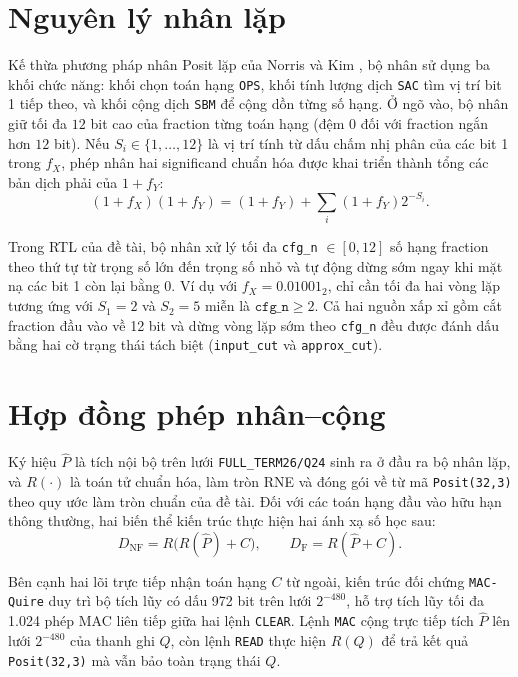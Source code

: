 

\section{Nguyên lý nhân lặp}
Kế thừa phương pháp nhân Posit lặp của Norris và Kim \cite{norris2021iterativeposit},
bộ nhân sử dụng ba khối chức năng: khối chọn toán hạng \texttt{OPS}, khối tính lượng
dịch \texttt{SAC} tìm vị trí bit 1 tiếp theo, và khối cộng dịch \texttt{SBM} để
cộng dồn từng số hạng. Ở ngõ vào, bộ nhân giữ tối đa $12$ bit cao của fraction
từng toán hạng (đệm 0 đối với fraction ngắn hơn $12$ bit). Nếu $S_i \in \{1,\dots,12\}$
là vị trí tính từ dấu chấm nhị phân của các bit 1 trong $f_X$, phép nhân hai
significand chuẩn hóa được khai triển thành tổng các bản dịch phải của $1+f_Y$:
\[
    (1+f_X)(1+f_Y) = (1+f_Y) + \sum_{i} (1+f_Y) 2^{-S_i}.
\]

Trong RTL của đề tài, bộ nhân xử lý tối đa \texttt{cfg\_n} $\in [0, 12]$ số hạng
fraction theo thứ tự từ trọng số lớn đến trọng số nhỏ và tự động dừng sớm ngay khi
mặt nạ các bit 1 còn lại bằng 0. Ví dụ với $f_X = 0.01001_2$, chỉ cần tối đa hai
vòng lặp tương ứng với $S_1 = 2$ và $S_2 = 5$ miễn là $\texttt{cfg\_n} \ge 2$. Cả hai
nguồn xấp xỉ gồm cắt fraction đầu vào về 12 bit và dừng vòng lặp sớm theo \texttt{cfg\_n}
đều được đánh dấu bằng hai cờ trạng thái tách biệt (\texttt{input\_cut} và
\texttt{approx\_cut}).

\section{Hợp đồng phép nhân--cộng}
Ký hiệu $\widehat P$ là tích nội bộ trên lưới \texttt{FULL\_TERM26/Q24} sinh ra ở
đầu ra bộ nhân lặp, và $R(\cdot)$ là toán tử chuẩn hóa, làm tròn RNE và đóng gói
về từ mã \texttt{Posit(32,3)} theo quy ước làm tròn chuẩn của đề tài. Đối với các toán
hạng đầu vào hữu hạn thông thường, hai biến thể kiến trúc thực hiện hai ánh xạ số
học sau:
\[
  D_{\mathrm{NF}} = R\bigl(R(\widehat P) + C\bigr), \qquad
  D_{\mathrm{F}}  = R(\widehat P + C).
\]

Bên cạnh hai lõi trực tiếp nhận toán hạng $C$ từ ngoài, kiến trúc đối chứng
\texttt{MAC-Quire} duy trì bộ tích lũy có dấu 972 bit trên lưới $2^{-480}$, hỗ
trợ tích lũy tối đa 1.024 phép MAC liên tiếp giữa hai lệnh \texttt{CLEAR}. Lệnh
\texttt{MAC} cộng trực tiếp tích $\widehat P$ lên lưới $2^{-480}$ của thanh ghi
$Q$, còn lệnh \texttt{READ} thực hiện $R(Q)$ để trả kết quả \texttt{Posit(32,3)}
mà vẫn bảo toàn trạng thái $Q$.

